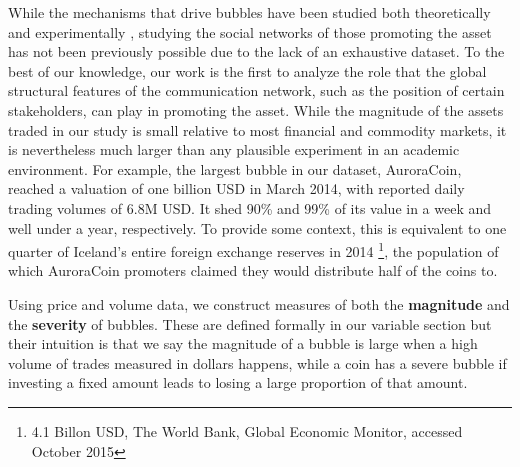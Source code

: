 While the mechanisms that drive bubbles have been studied both theoretically 
\cite{abolafia1988enacting,earl2007decision,bakker2010social,harras2011grow}
and experimentally
\cite{moinas2013bubble},
studying the social networks of those promoting the asset has not been previously possible due to the lack of an exhaustive dataset. 
To the best of our knowledge, our work is the first to analyze the role that the global structural features of the communication network, such as the position of certain stakeholders, can play in promoting the asset.
While the magnitude of the assets traded in our study is small relative to most financial and commodity markets, it is nevertheless much larger than any plausible experiment in an academic environment.
For example, the largest bubble in our dataset, AuroraCoin, reached a valuation of one billion USD in March 2014,
with reported daily trading volumes of 6.8M USD. It shed 90\% and 99\% of its value in a week and well under a year, respectively.
To provide some context, this is equivalent to one quarter of Iceland's entire foreign exchange reserves in 2014 \footnote{4.1 Billon USD, The World Bank, Global Economic Monitor, accessed October 2015}, the population of which AuroraCoin promoters claimed they would distribute half of the coins to.

Using price and volume data, we construct measures of both the \textbf{magnitude} and the \textbf{severity} of bubbles.
These are defined formally in our variable section %
but their intuition is that we say the magnitude of a bubble is large when a high volume of trades measured in dollars happens,
while a coin has a severe bubble if investing a fixed amount leads to losing a large proportion of that amount. 

